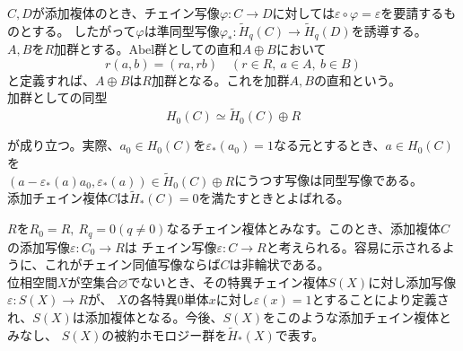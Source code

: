 \documentclass[dvipdfmx,a4paper,11pt]{jsarticle}
\begin{document}
$C,D$が添加複体のとき、チェイン写像$\varphi : C\to D$に対しては$\varepsilon \circ \varphi = \varepsilon$を要請するものとする。
したがって$\varphi$は準同型写像$\varphi_{*} : \widetilde{H}_{q}(C)\to \widetilde{H}_{q}(D)$を誘導する。\\
$A,B$を$R$加群とする。$\mathrm{Abel}$群としての直和$A\oplus B$において
\begin{equation*}
  r(a,b)=(ra,rb)\quad (r\in R,\ a\in A,\ b\in B)
\end{equation*}
と定義すれば、$A\oplus B$は$R$加群となる。これを加群$A,B$の直和という。\\
加群としての同型
\begin{equation*}
  H_{0}(C)\simeq \widetilde{H}_{0}(C)\oplus R
\end{equation*}

が成り立つ。実際、$a_{0}\in H_{0}(C)$を$\varepsilon_{*}(a_{0})=1$なる元とするとき、$a\in H_{0}(C)$を\\
$(a-\varepsilon_{*}(a)a_{0},\varepsilon_{*}(a))\in \widetilde{H}_{0}(C)\oplus R$にうつす写像は同型写像である。\\
添加チェイン複体$C$は$\widetilde{H}_{*}(C)=0$を満たすときとよばれる。

\clearpage

$R$を$R_{0}=R,\ R_{q}=0(q\neq 0)$なるチェイン複体とみなす。このとき、添加複体$C$の添加写像$\varepsilon : C_{0}\to R$は
チェイン写像$\varepsilon : C\to R$と考えられる。容易に示されるように、これがチェイン同値写像ならば$C$は非輪状である。\\
位相空間$X$が空集合$\varnothing$でないとき、その特異チェイン複体$S(X)$に対し添加写像$\varepsilon : S(X)\to R$が、
$X$の各特異$0$単体$x$に対し$\varepsilon(x)=1$とすることにより定義され、$S(X)$は添加複体となる。今後、$S(X)$をこのような添加チェイン複体とみなし、
$S(X)$の被約ホモロジー群を$\widetilde{H}_{*}(X)$で表す。
\end{document}
